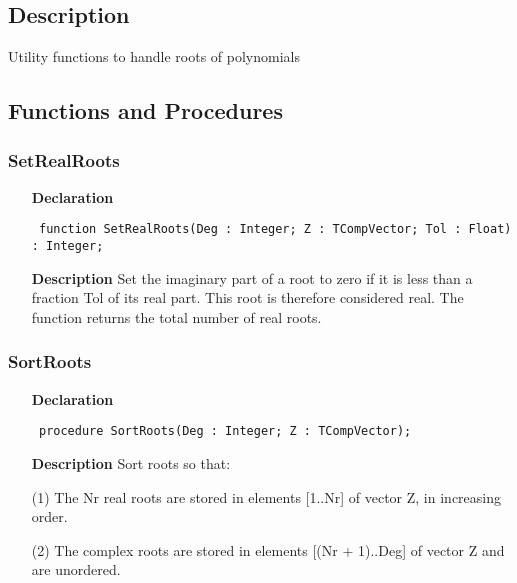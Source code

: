 \documentclass[12pt,a4paper,oneside]{report}
\newcommand{\declarationitem}[1]{\textbf{#1}}
\newcommand{\descriptiontitle}[1]{\textbf{#1}}
\newcommand{\code}[1]{\texttt{#1}}
\begin{document}
\subsection{Description}
Utility functions to handle roots of polynomials
\subsection{Functions and Procedures}
\subsubsection{SetRealRoots}
\label{upolutil-SetRealRoots}
\begin{itemize}\item[\declarationitem{Declaration}\hfill]
	\begin{flushleft}
		\code{
			function SetRealRoots(Deg : Integer; Z : TCompVector; Tol : Float) : Integer;}
		
	\end{flushleft}
	
	\par
	\item[\descriptiontitle{Description}]
	Set the imaginary part of a root to zero if it is less than a fraction Tol of its real part. This root is therefore considered real. The function returns the total number of real roots.
	
\end{itemize}
\subsubsection{SortRoots}
\label{upolutil-SortRoots}
\begin{itemize}\item[\declarationitem{Declaration}\hfill]
	\begin{flushleft}
		\code{
			procedure SortRoots(Deg : Integer; Z : TCompVector);}
		
	\end{flushleft}
	
	\par
	\item[\descriptiontitle{Description}]
	Sort roots so that:
	
	(1) The Nr real roots are stored in elements [1..Nr] of vector Z, in increasing order.
	
	(2) The complex roots are stored in elements [(Nr + 1)..Deg] of vector Z and are unordered.
\end{itemize}
\end{document}
